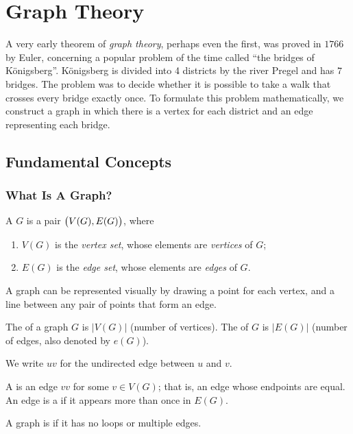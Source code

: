\chapter{Graph Theory}
A very early theorem of \emph{graph theory}, perhaps even the first, was proved in $1766$ by Euler, concerning a popular problem of the time called ``the bridges of K\"{o}nigsberg''. K\"{o}nigsberg is divided into 4 districts by the river Pregel and has $7$ bridges. The problem was to decide whether it is possible to take a walk that crosses every bridge exactly once. To formulate this problem mathematically, we construct a graph in which there is a vertex for each district and an edge representing each bridge.

\section{Fundamental Concepts}
\subsection{What Is A Graph?}
\begin{definition}[Graph]
A  $G$ is a pair $\left(V(G),E(G)\right)$, where
\begin{enumerate}[label=(\roman*)]
\item $V(G)$ is the \emph{vertex set}, whose elements are \emph{vertices} of $G$;
\item $E(G)$ is the \emph{edge set}, whose elements are \emph{edges} of $G$.
\end{enumerate}
\end{definition}

A graph can be represented visually by drawing a point for each vertex, and a line between any pair of points that form an edge.

\begin{definition}
The  of a graph $G$ is $|V(G)|$ (number of vertices). The  of $G$ is $|E(G)|$ (number of edges, also denoted by $e(G)$).
\end{definition}

\begin{notation}
We write $uv$ for the undirected edge between $u$ and $v$.
\end{notation}

\begin{definition}
A  is an edge $vv$ for some $v\in V(G)$; that is, an edge whose endpoints are equal. An edge is a  if it appears more than once in $E(G)$.

A graph is  if it has no loops or multiple edges.
\end{definition}

